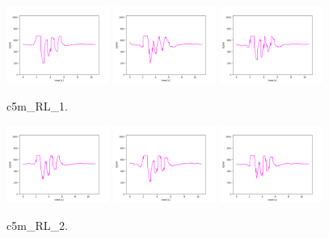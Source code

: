 \begin{figure}[!ht]
\begin{center}
\includegraphics[width=0.3\textwidth]{../data/c5m_RL_1/c5m_RL_1_1.png}
\includegraphics[width=0.3\textwidth]{../data/c5m_RL_1/c5m_RL_1_2.png}
\includegraphics[width=0.3\textwidth]{../data/c5m_RL_1/c5m_RL_1_3.png}
\caption{c5m\_RL\_1.\label{fig:c5m_RL_1}}
\end{center}
\end{figure}

\begin{figure}[!ht]
\begin{center}
\includegraphics[width=0.3\textwidth]{../data/c5m_RL_2/c5m_RL_2_1.png}
\includegraphics[width=0.3\textwidth]{../data/c5m_RL_2/c5m_RL_2_2.png}
\includegraphics[width=0.3\textwidth]{../data/c5m_RL_2/c5m_RL_2_3.png}
\caption{c5m\_RL\_2.\label{fig:c5m_RL_2}}
\end{center}
\end{figure}

